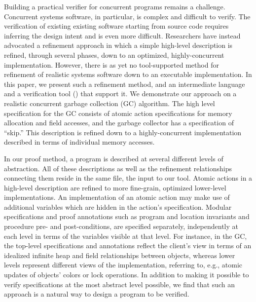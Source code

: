 Building a practical verifier for concurrent programs remains a challenge. 
Concurrent systems software, in particular, is complex and difficult to verify. 
The verification of existing existing software starting from source code requires inferring the design intent and is even more difficult. 
Researchers have instead advocated a refinement approach in which a simple high-level description is refined, through several phases, down to an optimized, highly-concurrent implementation.
However, there is as yet no tool-supported method for refinement of realistic systems software down to an executable implementation.
In this paper, we present such a refinement method, and an intermediate language  and a verification tool (\civl) that support it.
We demonstrate our approach on a realistic concurrent garbage collection (GC) algorithm.
The high level specification for the GC consists of atomic action specifications for memory allocation and field accesses, and the garbage collector has a specification of ``skip.'' This description is refined down to a highly-concurrent implementation described in terms of individual memory accesses.

In our proof method, a program is described at several different levels of abstraction. 
All of these descriptions as well as the refinement relationships connecting them reside in the same \civl file, the input to our tool. 
Atomic actions in a high-level description are refined to more fine-grain, optimized lower-level implementations. An implementation of an atomic action may make use of additional variables which are hidden in the action's specification. 
Modular specifications and proof annotations such as program and location invariants and procedure pre- and post-conditions, are specified separately, independently at each level in terms of the variables visible at that level. For instance, in the GC, the top-level specifications and annotations reflect the client's view in terms of an idealized infinite heap and field relationships between objects, 
 whereas lower levels represent different views of the implementation, referring to, e.g., atomic updates of objects' colors or lock operations.
In addition to making it possible to verify specifications at the most abstract level possible, we find that such an approach is a natural way to design a program to be verified.  


